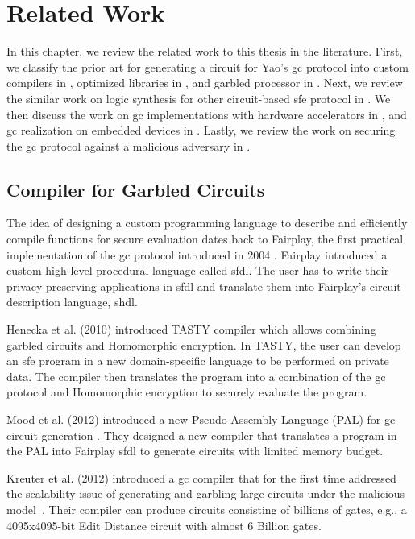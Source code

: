\chapter{Related Work}\label{chap:related}
In this chapter, we review the related work to this thesis in the literature.
First, we classify the prior art for generating a circuit for Yao's \acrfull{gc} protocol into custom compilers in , optimized libraries in , and garbled processor in .
Next, we review the similar work on logic synthesis for other circuit-based \acrshort{sfe} protocol in .
We then discuss the work on \acrshort{gc} implementations with hardware accelerators in , and \acrshort{gc} realization on embedded devices in .
Lastly, we review the work on securing the \acrshort{gc} protocol against a malicious adversary in .

\section{Compiler for Garbled Circuits}\label{sec:related-compiler}
The idea of designing a custom programming language to describe and efficiently compile functions for secure evaluation dates back to Fairplay, the first practical implementation of the \acrshort{gc} protocol introduced in 2004 \cite{malkhi2004fairplay}.
Fairplay introduced a custom high-level procedural language called \acrfull{sfdl}.
The user has to write their privacy-preserving applications in \acrshort{sfdl} and translate them into Fairplay's circuit description language, \acrfull{shdl}.

Henecka et al. (2010) introduced TASTY compiler \cite{henecka2010tasty} which allows combining garbled circuits and Homomorphic encryption.
In TASTY, the user can develop an \acrshort{sfe} program in a new domain-specific language to be performed on private data.
The compiler then translates the program into a combination of the \acrshort{gc} protocol and Homomorphic encryption to securely evaluate the program.

Mood et al. (2012) introduced a new Pseudo-Assembly Language (PAL) for \acrshort{gc} circuit generation \cite{mood2012memory}.
They designed a new compiler that translates a program in the PAL into Fairplay \acrshort{sfdl} to generate circuits with limited memory budget.

Kreuter et al. (2012) introduced a \acrshort{gc} compiler that for the first time addressed the scalability issue of generating and garbling large circuits under the malicious model~\cite{kreuter2012billion}.
Their compiler can produce circuits consisting of billions of gates, e.g., a 4095x4095-bit Edit Distance circuit with almost 6 Billion gates.

